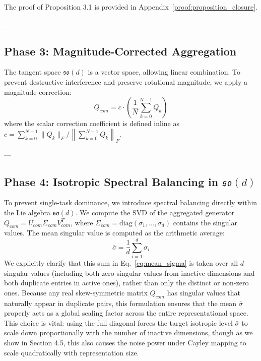 The proof of Proposition 3.1 is provided in Appendix~\ref{proof:proposition_closure}.

---

\subsection{Phase 3: Magnitude-Corrected Aggregation}
The tangent space $\mathfrak{so}(d)$ is a vector space, allowing linear combination. To prevent destructive interference and preserve rotational magnitude, we apply a magnitude correction:
\begin{equation}
Q_{com} = c \cdot \left( \frac{1}{N} \sum_{k=0}^{N-1} Q_k \right)
\end{equation}
where the scalar correction coefficient is defined inline as $c = \sum_{k=0}^{N-1} \|Q_k\|_F / \left\| \sum_{k=0}^{N-1} Q_k \right\|_F$.

---

\subsection{Phase 4: Isotropic Spectral Balancing in $\mathfrak{so}(d)$}
To prevent single-task dominance, we introduce spectral balancing directly within the Lie algebra $\mathfrak{so}(d)$. We compute the SVD of the aggregated generator $Q_{com} = U_{com} \Sigma_{com} V_{com}^T$, where $\Sigma_{com} = \mathrm{diag}(\sigma_1, \dots, \sigma_d)$ contains the singular values. The mean singular value is computed as the arithmetic average:
\begin{equation}
\label{eq:mean_sigma}
\bar{\sigma} = \frac{1}{d} \sum_{i=1}^d \sigma_i
\end{equation}
We explicitly clarify that this sum in Eq.~\ref{eq:mean_sigma} is taken over all $d$ singular values (including both zero singular values from inactive dimensions and both duplicate entries in active ones), rather than only the distinct or non-zero ones. Because any real skew-symmetric matrix $Q_{com}$ has singular values that naturally appear in duplicate pairs, this formulation ensures that the mean $\bar{\sigma}$ properly acts as a global scaling factor across the entire representational space. This choice is vital: using the full diagonal forces the target isotropic level $\bar{\sigma}$ to scale down proportionally with the number of inactive dimensions, though as we show in Section 4.5, this also causes the noise power under Cayley mapping to scale quadratically with representation size.

